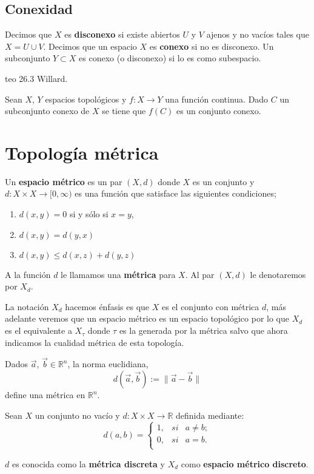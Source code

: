 \subsection*{Conexidad}
 Decimos que $X$ es \textbf{disconexo} si existe abiertos $U$ y $V$ ajenos y no vacíos tales que $X = U \cup V$. Decimos que un espacio $X$ es \textbf{conexo} si no es disconexo. Un subconjunto $Y \subset X$ es conexo (o disconexo) si lo es como subespacio.
	

teo 26.3 Willard.

\begin{te}
Sean $X$, $Y$ espacios topológicos y $f:X \to Y$ una función continua. Dado $C$ un subconjunto conexo de $X$ se tiene que $f(C)$ es un conjunto conexo.
\end{te}


\section*{Topología métrica}
Un \textbf{espacio métrico} es un par $(X, d)$ donde $X$ es un conjunto y $d:X \times X \to [0, \infty)$ es una función que satisface las siguientes condiciones;

\begin{enumerate}
\item $d(x,y)=0$ si y sólo si $x=y$,
\item $d(x,y)=d(y,x)$
\item $d(x,y) \leq d(x,z)+d(y,z)$
\end{enumerate}


A la función $d$ le llamamos una \textbf{métrica} para $X$. Al par $(X,d)$ le denotaremos por $X_d$. 

\begin{ob}
La notación $X_d$ hacemos énfasis es que $X$ es el conjunto con métrica $d$, más adelante veremos que un espacio métrico es un espacio topológico por lo que $X_d$ es el equivalente a $X_\tau$ donde $\tau$ es la generada por la métrica salvo que ahora indicamos la cualidad métrica de esta topología.  
\end{ob}

\begin{ej}
 Dados $\vec{a}$, $\vec{b} \in \mathbb{R}^{n}$, la norma euclidiana,
$$d(\vec{a},\vec{b}):=\parallel \vec{a}-\vec{b} \parallel$$
define una métrica en $\mathbb{R}^{n}$.
\end{ej}

\begin{ej}
 Sean $X$ un conjunto no vacío y $d : X \times X \to\mathbb{R}$ definida mediante:
$$d(a,b)=\left\{
\begin{array}{lcc}
1, & si & a \neq b; \\
0, & si & a=b. \\
\end{array}
\right.$$

$d$ es conocida como la \textbf{métrica discreta} y  $X_{d}$ como \textbf{espacio métrico discreto}.
\end{ej}

